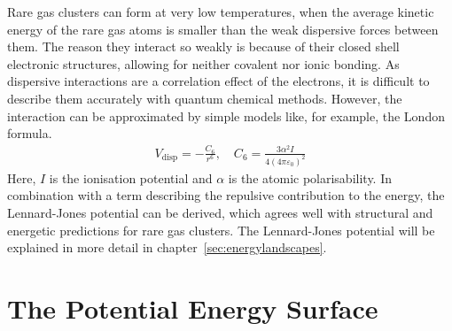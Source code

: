 Rare gas clusters can form at very low temperatures, when the average kinetic
energy of the rare gas atoms is smaller than the weak dispersive forces between
them. The reason they interact so weakly is because of their closed shell
electronic structures, allowing for neither covalent nor ionic bonding. As
dispersive interactions are a correlation effect of the electrons, it is
difficult to describe them accurately with quantum chemical methods. However,
the interaction can be approximated by simple models like, for example, the
London formula.
%
\begin{align}
    V_\text{disp}=-\frac{C_6}{r^6},\quad C_6=\frac{3\alpha^2I}{4\left(4\pi\varepsilon_0\right)^2}
\end{align}
%
Here, $I$ is the ionisation potential and $\alpha$ is the atomic polarisability.
In combination with a term describing the repulsive contribution to the energy,
the Lennard-Jones potential can be derived, which agrees well with structural
and energetic predictions for rare gas clusters. The Lennard-Jones potential
will be explained in more detail in chapter~\ref{sec:energylandscapes}.

\section{The Potential Energy Surface}
\label{sec:ThePotentialEnergySurface}

